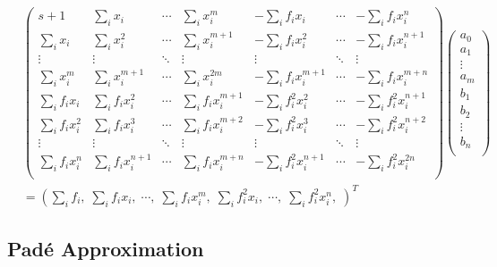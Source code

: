 \documentclass[a4paper]{article}
\begin{document}
\begin{align*}
	& \begin{pmatrix} 
		s+1 &
		\sum_{i} x_i &
		\cdots &
		\sum_{i} x_i ^{m} &
		- \sum_{i} f_i x_i &
		\cdots &
		- \sum_{i} f_i x_i ^{n} \\[1em]
		\sum_{i} x_i &
		\sum_{i} x_i ^2 &
		\cdots &
		\sum_{i} x_i ^{m+1} &
		- \sum_{i} f_i x_i ^2 &
		\cdots &
		- \sum_{i} f_i x_i ^{n+1} \\[1em]
		\vdots &
		\vdots &
		\ddots &
		\vdots &
		\vdots &
		\ddots &
		\vdots \\[1em]
		\sum_{i} x_i ^{m} &
		\sum_{i} x_i ^{m+1} &
		\cdots &
		\sum_{i} x_i ^{2m} &
		- \sum_{i} f_i x_i ^{m+1} &
		\cdots &
		- \sum_{i} f_i x_i ^{m+n} \\[1em]
		\sum_{i} f_i x_i &
		\sum_{i} f_i x_i ^2 &
		\cdots &
		\sum_{i} f_i x_i ^{m+1} &
		- \sum_{i} f_i ^2 x_i ^2 &
		\cdots &
		- \sum_{i} f_i ^2 x_i ^{n+1} \\[1em]
		\sum_{i} f_i x_i ^2 &
		\sum_{i} f_i x_i ^3 &
		\cdots &
		\sum_{i} f_i x_i ^{m+2} &
		- \sum_{i} f_i ^2 x_i ^3 &
		\cdots &
		- \sum_{i} f_i ^2 x_i ^{n+2} \\[1em]
		\vdots &
		\vdots &
		\ddots &
		\vdots &
		\vdots &
		\ddots &
		\vdots \\[1em]
		\sum_{i} f_i x_i ^n &
		\sum_{i} f_i x_i ^{n+1} &
		\cdots &
		\sum_{i} f_i x_i ^{m+n} &
		- \sum_{i} f_i ^2 x_i ^{n+1} &
		\cdots &
		- \sum_{i} f_i ^2 x_i ^{2n} \\[1em]
	\end{pmatrix} 
	\begin{pmatrix} 
		a_0 \\[1em]
		a_1 \\[1em]
		\vdots \\[1em]
		a_m \\[1em]
		b_1 \\[1em]
		b_2 \\[1em]
		\vdots \\[1em]
		b_n \\[1em]
	\end{pmatrix} \\
	&= \left(
		\sum_i f_i, \;
		\sum_i f_i x_{i}, \;
		\cdots, \;
		\sum_i f_i x_{i} ^{m}, \;
		\sum_i f_i ^2 x_{i}, \;
		\cdots, \;
		\sum_i f_i ^2 x_{i} ^{n}, \;
	\right) ^{T}
\end{align*}

\subsection{Pad\'e Approximation}
\end{document}
